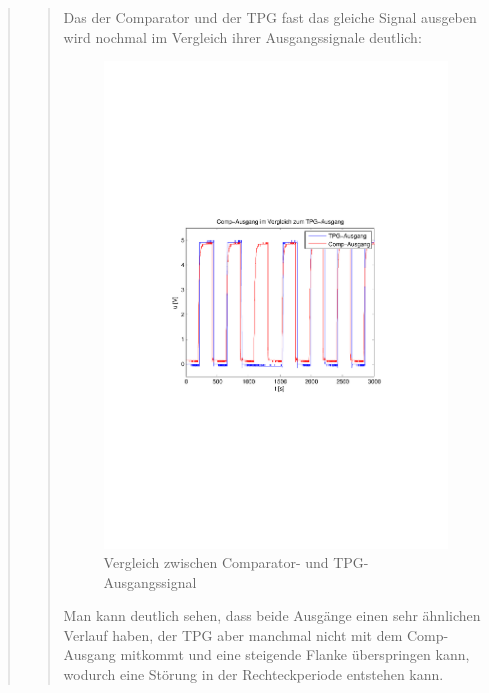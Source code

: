 \begin{quote}
\begin{quote}
           Das der Comparator und der TPG fast das gleiche Signal ausgeben wird
           nochmal im Vergleich ihrer Ausgangssignale deutlich:
           
            
             \begin{figure}[H] \centering
                    \includegraphics[scale=0.5, trim = 2cm 6.5cm 1.5cm 8.5cm,
                    clip]{./Bilder/comp_vs_tpg}
                        \caption{Vergleich zwischen Comparator- und
                        TPG-Ausgangssignal}
                \end{figure}
          
          Man kann deutlich sehen, dass beide Ausgänge einen sehr ähnlichen
          Verlauf haben, der TPG aber manchmal nicht mit dem Comp-Ausgang
          mitkommt und eine steigende Flanke überspringen kann, wodurch eine
          Störung in der Rechteckperiode entstehen kann.\\
          

\end{quote}
\end{quote}
